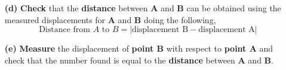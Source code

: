 \documentclass[A4,12pt]{article}
\begin{document}
\begin{enumerate}[label=\bfseries (\arabic*)]
\begin{itemize}
     \item[\bf (d)] \textbf{Check} that the \textbf{distance} between \textbf{A} and \textbf{B} can be obtained using the measured displacements for \textbf{A} and \textbf{B} doing the following,
     \begin{equation*}
         \text{Distance from $A$ to $B$}=|\text{displacement B}-\text{displacement A}|
     \end{equation*}
     \item[\bf (e)] \textbf{Measure} the displacement of \textbf{point B} with respect to \textbf{point A} and check that the number found is equal to the \textbf{distance} between \textbf{A} and \textbf{B}. 
\end{itemize}














\end{enumerate}
\end{document}
